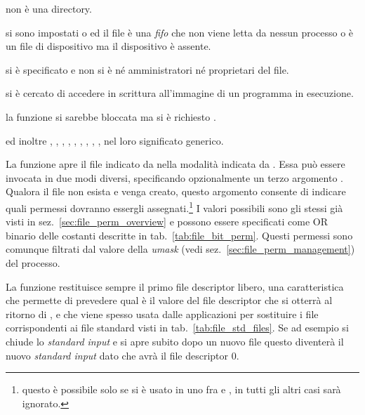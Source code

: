 \begin{funcproto}{

}
{\begin{errlist}
     non è una directory.
  \item[\errcode{ENXIO}] si sono impostati  o
     ed il file è una \textit{fifo} che non viene letta da
    nessun processo o  è un file di dispositivo ma il
    dispositivo è assente.
  \item[\errcode{EPERM}] si è specificato  e non si è né
    amministratori né proprietari del file.
  \item[\errcode{ETXTBSY}] si è cercato di accedere in scrittura all'immagine
    di un programma in esecuzione.
  \item[\errcode{EWOULDBLOCK}] la funzione si sarebbe bloccata ma si è
    richiesto .
  \end{errlist}
  ed inoltre , , , ,
  , , , ,
  , nel loro significato generico.}
\end{funcproto}

La funzione apre il file indicato da  nella modalità indicata
da . Essa può essere invocata in due modi diversi, specificando
opzionalmente un terzo argomento . Qualora il file non esista e
venga creato, questo argomento consente di indicare quali permessi dovranno
essergli assegnati.\footnote{questo è possibile solo se si è usato in
   uno fra  e , in tutti gli
  altri casi sarà ignorato.} I valori possibili sono gli stessi già visti in
sez.~\ref{sec:file_perm_overview} e possono essere specificati come OR binario
delle costanti descritte in tab.~\ref{tab:file_bit_perm}. Questi permessi sono
comunque filtrati dal valore della \textit{umask} (vedi
sez.~\ref{sec:file_perm_management}) del processo.

La funzione restituisce sempre il primo file descriptor libero, una
caratteristica che permette di prevedere qual è il valore del file descriptor
che si otterrà al ritorno di , e che viene spesso usata dalle
applicazioni per sostituire i file corrispondenti ai file standard visti in
tab.~\ref{tab:file_std_files}. Se ad esempio si chiude lo \textit{standard
  input} e si apre subito dopo un nuovo file questo diventerà il nuovo
\textit{standard input} dato che avrà il file descriptor 0.

